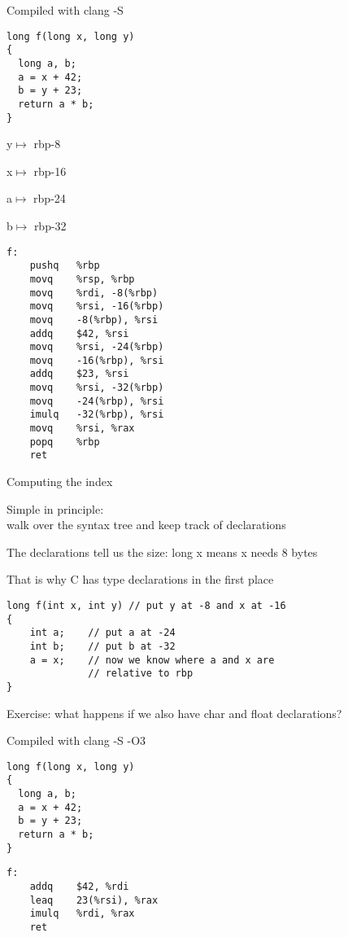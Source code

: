 \documentclass[landscape]{beamer}
\begin{document}
\begin{frame}[fragile]{Compiled with clang -S}
\begin{minipage}{.5\textwidth}
\begin{verbatim}
long f(long x, long y)
{
  long a, b;
  a = x + 42;
  b = y + 23;
  return a * b;
}
\end{verbatim}

y$\mapsto$ rbp-8

x$\mapsto$ rbp-16

a$\mapsto$ rbp-24

b$\mapsto$ rbp-32

\end{minipage}
%
\begin{minipage}{.4\textwidth}
\begin{verbatim}
f:
	pushq	%rbp
	movq	%rsp, %rbp
	movq	%rdi, -8(%rbp)
	movq	%rsi, -16(%rbp)
	movq	-8(%rbp), %rsi
	addq	$42, %rsi
	movq	%rsi, -24(%rbp)
	movq	-16(%rbp), %rsi
	addq	$23, %rsi
	movq	%rsi, -32(%rbp)
	movq	-24(%rbp), %rsi
	imulq	-32(%rbp), %rsi
	movq	%rsi, %rax
	popq	%rbp
	ret
\end{verbatim}
\end{minipage}
\end{frame}


\begin{frame}[fragile]{Computing the index}

Simple in principle: 
\\
walk over the syntax tree and keep track of declarations

The declarations tell us the size: long x means x needs 8 bytes

That is why C has type declarations in the first place

\begin{verbatim}
long f(int x, int y) // put y at -8 and x at -16
{
    int a;    // put a at -24
    int b;    // put b at -32
    a = x;    // now we know where a and x are 
              // relative to rbp
}    
\end{verbatim}

Exercise: what happens if we also have char and float declarations?    
\end{frame}
\begin{frame}[fragile]{Compiled with clang -S -O3}
\begin{minipage}{.5\textwidth}
\begin{verbatim}
long f(long x, long y)
{
  long a, b;
  a = x + 42;
  b = y + 23;
  return a * b;
}
\end{verbatim}
\end{minipage}
%
\begin{minipage}{.4\textwidth}
\begin{verbatim}
f:                                      
	addq	$42, %rdi
	leaq	23(%rsi), %rax
	imulq	%rdi, %rax
	ret
\end{verbatim}
\end{minipage}
\end{frame}
\end{document}
